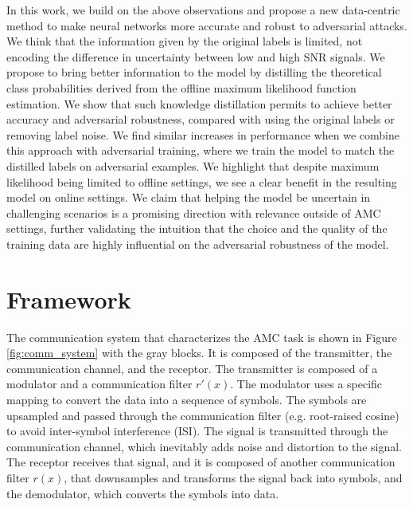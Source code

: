 \documentclass[conference]{IEEEtran}
\newcommand{\pf}[1]{{\textcolor{orange}{PF: {#1}}}}
\begin{document}

In this work, we build on the above observations and propose a new data-centric method to make neural networks more accurate and robust to adversarial attacks. We think that the information given by the original labels is limited, not encoding the difference in uncertainty between low and high SNR signals. We propose to bring better information to the model 
by distilling the theoretical class probabilities derived from the offline maximum likelihood function estimation. We show that such knowledge distillation permits to achieve better accuracy and adversarial robustness, compared with using the original labels or removing label noise. We find similar increases in performance when we combine this approach with adversarial training, where we train the model to match the distilled labels on adversarial examples. We highlight that despite maximum likelihood being limited to offline settings, we see a clear benefit in the resulting model on online settings. We claim that helping the model be uncertain in challenging scenarios is a promising direction with relevance outside of AMC settings, further validating the intuition that the choice and the quality of the training data are highly influential on the adversarial robustness of the model.


\section{Framework}


The communication system that characterizes the AMC task is shown in Figure \ref{fig:comm_system} with the gray blocks. It is composed of the transmitter, the communication channel, and the receptor. The transmitter is composed of a modulator and a communication filter $r'(x)$. The modulator uses a specific mapping to convert the data into a sequence of symbols. The symbols are upsampled and passed through the communication filter (e.g. root-raised cosine) to avoid inter-symbol interference (ISI). The signal is transmitted through the communication channel, which inevitably adds noise and distortion to the signal. The receptor receives that signal, and it is composed of another communication filter $r(x)$, that downsamples and transforms the signal back into symbols, and the demodulator, which converts the symbols into data. 
\end{document}
